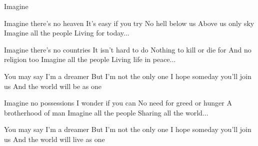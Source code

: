 \begin{sang}{Imagine}{}
\begin{vers}
Imagine there's no heaven
It's easy if you try
No hell below us
Above us only sky
Imagine all the people
Living for today...
\end{vers}
\begin{vers}
Imagine there's no countries
It isn't hard to do
Nothing to kill or die for
And no religion too
Imagine all the people
Living life in peace...
\end{vers}
\vfill
\begin{vers}
You may say I'm a dreamer
But I'm not the only one
I hope someday you'll join us
And the world will be as one
\end{vers}
\begin{vers}
Imagine no possessions
I wonder if you can
No need for greed or hunger
A brotherhood of man
Imagine all the people
Sharing all the world...
\end{vers}
\begin{vers}
You may say I'm a dreamer
But I'm not the only one
I hope someday you'll join us
And the world will live as one
\end{vers}
\laps
\end{sang}
